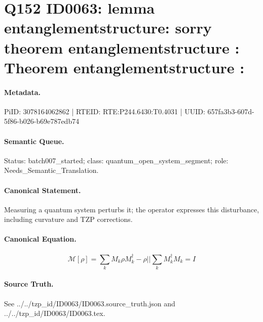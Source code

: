 \section*{Q152 ID0063: lemma entanglementstructure: sorry theorem entanglementstructure : Theorem entanglementstructure :}
\paragraph{Metadata.}
PiID: 3078164062862 | RTEID: RTE:P244.6430:T0.4031 | UUID: 657fa3b3-607d-5f86-b026-b69e787edb74

\paragraph{Semantic Queue.}
Status: batch007\_started; class: quantum\_open\_system\_segment; role: Needs\_Semantic\_Translation.

\paragraph{Canonical Statement.}
Measuring a quantum system perturbs it; the operator expresses this disturbance, including curvature and TZP corrections.

\paragraph{Canonical Equation.}
\[
\mathcal{M}[\rho] = \sum_{k} M_{k}\rho M_{k}^{\dagger} - \rho || \sum_{k} M_{k}^{\dagger}M_{k} = I
\]

\paragraph{Source Truth.}
See ../../tzp\_id/ID0063/ID0063.source\_truth.json and ../../tzp\_id/ID0063/ID0063.tex.
